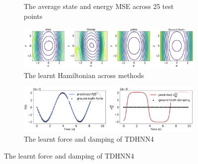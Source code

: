 \documentclass{article}
\begin{document}
\begin{figure}[!htb]
\begin{subfigure}[b]{0.48\textwidth}
\caption{The average state and energy MSE across 25 test points}
\end{subfigure}
\begin{subfigure}[b]{0.48\textwidth}
\includegraphics[width=\textwidth]{figures/figures/relativity/1/relativity_hamiltonian_0.pdf}
\caption{The learnt Hamiltonian across methods}
\end{subfigure}
\begin{subfigure}[b]{0.48\textwidth}
\includegraphics[width=\textwidth]{figures/figures/relativity/1/relativity_dpdt_new_0.pdf}
\caption{The learnt force and damping of TDHNN4}
\end{subfigure}
\label{duffing_1_full}
\end{figure}

\pagebreak
\onecolumn
\end{document}
